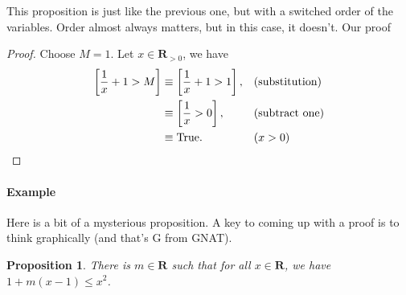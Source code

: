 \documentclass[12pt,fleqn]{article}
\newcommand{\reals}{\mathbf{R}}
\newcommand{\true}{\mathrm{True}}
\newenvironment{myproof}
  {\begin{shaded}\begin{proof}}
  {\end{proof}\end{shaded}}
\newtheorem{prop}{Proposition}
\newcounter{ex}\setcounter{ex}{0}
\newcommand{\ex}{%
\setcounter{ex}{\value{ex}+1}
\paragraph{Example \theex}}
\begin{document}
    This proposition  is just like the previous one, but with a switched order of the variables.  Order almost always matters, but in this case, it 
    doesn't. Our proof
    
    \begin{myproof} Choose $M=1$. Let $x  \in \reals_{>0}$, we have
    \begin{align*}
      \left [ \frac{1}{x} + 1 > M \right] &\equiv    \left [ \frac{1}{x} + 1 > 1 \right], &&(\text{substitution}) \\
                                                               &\equiv    \left [ \frac{1}{x}  > 0 \right], &&(\text{subtract one}) \\
                                                               &\equiv \true.    &&  (x > 0) \qedhere
  \end{align*} 
    
    
    \end{myproof}


    \ex Here is a bit of a mysterious proposition. A key to coming 
    up with a proof is to think graphically (and that's G from GNAT).
        \begin{prop}
      There is $m \in \reals$ such that for all $x \in \reals$, we 
     have $1 + m(x-1) \leq x^2$. 
     \end{prop}
     
\end{document}

